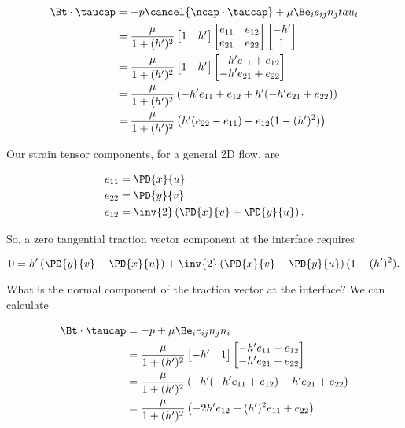 \begin{align*}
\Bt \cdot \taucap 
&=
-p \cancel{\ncap \cdot \taucap} + \mu \Be_i e_{ij} n_j tau_i \\
&=
\frac{\mu}{1 + (h')^2}
\begin{bmatrix}
1 & h' 
\end{bmatrix}
\begin{bmatrix}
e_{11} & e_{12} \\
e_{21} & e_{22}
\end{bmatrix}
\begin{bmatrix}
-h'  \\
1
\end{bmatrix} \\
&=
\frac{\mu}{1 + (h')^2}
\begin{bmatrix}
1 & h' 
\end{bmatrix}
\begin{bmatrix}
-h' e_{11} + e_{12} \\
-h' e_{21} + e_{22}
\end{bmatrix} \\
&=
\frac{\mu}{1 + (h')^2}
\left(
-h' e_{11} + e_{12} + h'( -h' e_{21} + e_{22} )
\right) \\
&=
\frac{\mu}{1 + (h')^2}
\left(
h' (e_{22} - e_{11} )
+ e_{12} (1 - (h')^2 )
\right) 
\end{align*}

Our strain tensor components, for a general 2D flow, are

\begin{align}\label{eqn:inclinedFlowWithoutConstantHeightAssumption:200}
e_{11} &= \PD{x}{u} \\
e_{22} &= \PD{y}{v} \\
e_{12} &= 
\inv{2} \left( 
\PD{x}{v} +
\PD{y}{u}
\right).
\end{align}

So, a zero tangential traction vector component at the interface requires

\begin{equation}\label{eqn:inclinedFlowWithoutConstantHeightAssumption:220}
0 = h' \left( \PD{y}{v} - \PD{x}{u} \right) + 
\inv{2} \left( 
\PD{x}{v} +
\PD{y}{u}
\right)
(1 - (h')^2 ).
\end{equation}

What is the normal component of the traction vector at the interface?  We can calculate

\begin{align*}
\Bt \cdot \taucap 
&=
-p + \mu \Be_i e_{ij} n_j n_i \\
&=
\frac{\mu}{1 + (h')^2}
\begin{bmatrix}
-h' & 1
\end{bmatrix}
\begin{bmatrix}
-h' e_{11} + e_{12} \\
-h' e_{21} + e_{22}
\end{bmatrix} \\
&=
\frac{\mu}{1 + (h')^2}
\left(
-h'(-h' e_{11} + e_{12}) -h' e_{21} + e_{22}
\right)  \\
&=
\frac{\mu}{1 + (h')^2}
\left(
-2 h' e_{12} 
+ (h')^2 e_{11} + e_{22}
\right)
\end{align*}

